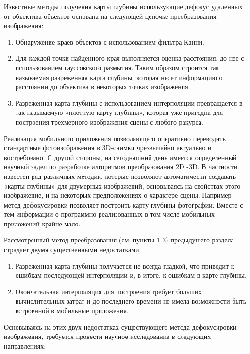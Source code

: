 Известные методы получения карты глубины использующие дефокус удаленных от объектива объектов основана на следующей цепочке преобразования изображения\cite{depthMap1}:

\begin{enumerate} 
	\item Обнаружение краев объектов с использованием фильтра Канни.
	\item Для каждой точки найденного края выполняется оценка расстояния, до нее с использованием гауссовского размытия. Таким образом строится так называемая разреженная карта глубины, которая несет информацию о расстоянии до объектива в некоторых точках изображения. 
	\item Разреженная карта глубины с использованием интерполяции превращается в так называемую «плотную карту глубины», которая уже пригодна для построения трехмерного изображения сцены с любого ракурса. 
\end{enumerate}

Реализация мобильного приложения позволяющего оперативно переводить стандартные фотоизображения в 3D-снимки чрезвычайно актуально и востребовано.  С другой стороны, на сегодняшний день имеется определенный научный задел по разработке алгоритмов преобразования 2D -3D. В частности известен ряд различных методик, которые позволяют автоматически создавать «карты глубины» для двумерных изображений, основываясь на свойствах этого изображение, и на некоторых предположениях о характере сцены. Например метод дефокусировки позволяет  построить карту глубины фотографии. Вместе с тем информации о программно реализованных в том числе мобильных приложений крайне мало. 

Рассмотренный метод преобразования (см. пункты 1-3) предыдущего раздела страдает двумя существенными недостатками\cite{depthMap2}.

\begin{enumerate}
	\item Разреженная карта глубины получается не всегда гладкой, что приводит к ошибкам последующей интерполяции и, в итоге, к ошибкам в карте глубины. 
	\item Окончательная интерполяция для построения требует больших вычислительных затрат и до последнего времени не имела возможности быть встроенной в мобильные приложения. 
\end{enumerate}

Основываясь на этих двух недостатках существующего метода дефокусировки изображения, требуется провести научное исследование в следующих направлениях:

